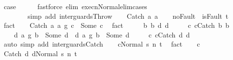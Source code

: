 \begin{isabellebody}
\ {\isacharquery}case\isanewline
\ \ \ \ \isamarkupfalse%
\ {\isacharparenleft}fastforce\ elim{\isacharcolon}\ execn{\isacharunderscore}Normal{\isacharunderscore}elim{\isacharunderscore}cases\ \isanewline
\ \ \ \ \ \ \ \ simp\ add{\isacharcolon}\ inter{\isacharunderscore}guards{\isacharunderscore}Throw{\isacharparenright}\isanewline
{}\isamarkupfalse%
\isanewline
\ \ \isamarkupfalse%
\ {\isacharparenleft}Catch\ a{}\ a{}{\isacharparenright}\isanewline
\ \ \isamarkupfalse%
\ noFault{\isacharcolon}\ {\isachardoublequoteopen}{\isasymnot}\ isFault\ t{\isachardoublequoteclose}\ \isamarkupfalse%
\ fact\isanewline
\ \ \isamarkupfalse%
\ {\isachardoublequoteopen}{\isacharparenleft}Catch\ a{}\ a{}\ {\isasyminter}\isactrlsub g\ c{}{\isacharparenright}\ {\isacharequal}\ Some\ c{\isachardoublequoteclose}\ \isamarkupfalse%
\ fact\isanewline
\ \ \isamarkupfalse%
\ \isamarkupfalse%
\ b{}\ b{}\ d{}\ d{}\ \isanewline
\ \ \ \ c{}{\isacharcolon}\ {\isachardoublequoteopen}c{}{\isacharequal}Catch\ b{}\ b{}{\isachardoublequoteclose}\ \ \isanewline
\ \ \ \ d{}{\isacharcolon}\ {\isachardoublequoteopen}{\isacharparenleft}a{}\ {\isasyminter}\isactrlsub g\ b{}{\isacharparenright}\ {\isacharequal}\ Some\ d{}{\isachardoublequoteclose}\ \ d{}{\isacharcolon}\ {\isachardoublequoteopen}{\isacharparenleft}a{}\ {\isasyminter}\isactrlsub g\ b{}{\isacharparenright}\ {\isacharequal}\ Some\ d{}{\isachardoublequoteclose}\ \isanewline
\ \ \ \ c{\isacharcolon}\ {\isachardoublequoteopen}c{\isacharequal}Catch\ d{}\ d{}{\isachardoublequoteclose}\isanewline
\ \ \ \ \isamarkupfalse%
\ {\isacharparenleft}auto\ simp\ add{\isacharcolon}\ inter{\isacharunderscore}guards{\isacharunderscore}Catch{\isacharparenright}\isanewline
\ \ \isamarkupfalse%
\ {\isachardoublequoteopen}{\isasymGamma}{\isasymturnstile}{\isasymlangle}c{\isacharcomma}Normal\ s{\isasymrangle}\ {\isacharequal}n{\isasymRightarrow}\ t{\isachardoublequoteclose}\ \isamarkupfalse%
\ fact\isanewline
\ \ \isamarkupfalse%
\ c\ \isamarkupfalse%
\ {\isachardoublequoteopen}{\isasymGamma}{\isasymturnstile}{\isasymlangle}Catch\ d{}\ d{}{\isacharcomma}Normal\ s{\isasymrangle}\ {\isacharequal}n{\isasymRightarrow}\ t{\isachardoublequoteclose}\ \isamarkupfalse%

\end{isabellebody}
